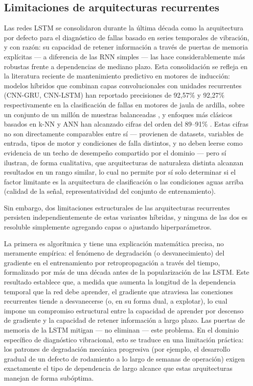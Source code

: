 \documentclass[11pt]{article}
\begin{document}
\subsection{Limitaciones de arquitecturas recurrentes}
\label{sec:limitaciones-recurrentes}

Las redes LSTM se consolidaron durante la última década como la arquitectura por defecto para el diagnóstico de fallas basado en series temporales de vibración, y con razón: su capacidad de retener información a través de puertas de memoria explícitas --- a diferencia de las RNN simples --- las hace considerablemente más robustas frente a dependencias de mediano plazo. Esta consolidación se refleja en la literatura reciente de mantenimiento predictivo en motores de inducción: modelos híbridos que combinan capas convolucionales con unidades recurrentes (CNN-GRU, CNN-LSTM) han reportado precisiones de 92,57\% y 92,27\% respectivamente en la clasificación de fallas en motores de jaula de ardilla, sobre un conjunto de un millón de muestras balanceadas \citep{plosone2025}, y enfoques más clásicos basados en k-NN y ANN han alcanzado cifras del orden del 89--91\% \citep{abdulkareem2025}. Estas cifras no son directamente comparables entre sí --- provienen de datasets, variables de entrada, tipos de motor y condiciones de falla distintos, y no deben leerse como evidencia de un techo de desempeño compartido por el dominio --- pero sí ilustran, de forma cualitativa, que arquitecturas de naturaleza distinta alcanzan resultados en un rango similar, lo cual no permite por sí solo determinar si el factor limitante es la arquitectura de clasificación o las condiciones aguas arriba (calidad de la señal, representatividad del conjunto de entrenamiento).

Sin embargo, dos limitaciones estructurales de las arquitecturas recurrentes persisten independientemente de estas variantes híbridas, y ninguna de las dos es resoluble simplemente agregando capas o ajustando hiperparámetros.

La primera es algorítmica y tiene una explicación matemática precisa, no meramente empírica: el fenómeno de degradación (o desvanecimiento) del gradiente en el entrenamiento por retropropagación a través del tiempo, formalizado por \citet{bengio1994} más de una década antes de la popularización de las LSTM. Este resultado establece que, a medida que aumenta la longitud de la dependencia temporal que la red debe aprender, el gradiente que atraviesa las conexiones recurrentes tiende a desvanecerse (o, en su forma dual, a explotar), lo cual impone un compromiso estructural entre la capacidad de aprender por descenso de gradiente y la capacidad de retener información a largo plazo. Las puertas de memoria de la LSTM mitigan --- no eliminan --- este problema. En el dominio específico de diagnóstico vibracional, esto se traduce en una limitación práctica: los patrones de degradación mecánica progresiva (por ejemplo, el desarrollo gradual de un defecto de rodamiento a lo largo de semanas de operación) exigen exactamente el tipo de dependencia de largo alcance que estas arquitecturas manejan de forma subóptima.
\end{document}
